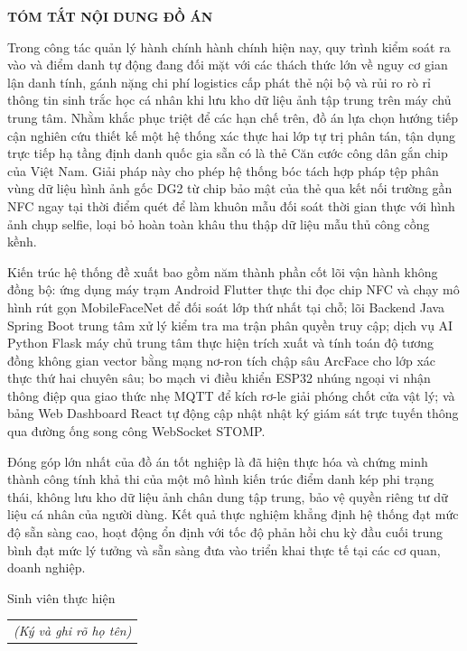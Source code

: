 \documentclass[../DoAn.tex]{subfiles}
\begin{document}
\begin{center}
    \Large{\textbf{TÓM TẮT NỘI DUNG ĐỒ ÁN}}\\
\end{center}
\vspace{1cm}

Trong công tác quản lý hành chính hành chính hiện nay, quy trình kiểm soát ra vào và điểm danh tự động đang đối mặt với các thách thức lớn về nguy cơ gian lận danh tính, gánh nặng chi phí logistics cấp phát thẻ nội bộ và rủi ro rò rỉ thông tin sinh trắc học cá nhân khi lưu kho dữ liệu ảnh tập trung trên máy chủ trung tâm. Nhằm khắc phục triệt để các hạn chế trên, đồ án lựa chọn hướng tiếp cận nghiên cứu thiết kế một hệ thống xác thực hai lớp tự trị phân tán, tận dụng trực tiếp hạ tầng định danh quốc gia sẵn có là thẻ Căn cước công dân gắn chip của Việt Nam. Giải pháp này cho phép hệ thống bóc tách hợp pháp tệp phân vùng dữ liệu hình ảnh gốc DG2 từ chip bảo mật của thẻ qua kết nối trường gần NFC ngay tại thời điểm quét để làm khuôn mẫu đối soát thời gian thực với hình ảnh chụp selfie, loại bỏ hoàn toàn khâu thu thập dữ liệu mẫu thủ công cồng kềnh. 

Kiến trúc hệ thống đề xuất bao gồm năm thành phần cốt lõi vận hành không đồng bộ: ứng dụng máy trạm Android Flutter thực thi đọc chip NFC và chạy mô hình rút gọn MobileFaceNet để đối soát lớp thứ nhất tại chỗ; lõi Backend Java Spring Boot trung tâm xử lý kiểm tra ma trận phân quyền truy cập; dịch vụ AI Python Flask máy chủ trung tâm thực hiện trích xuất và tính toán độ tương đồng không gian vector bằng mạng nơ-ron tích chập sâu ArcFace cho lớp xác thực thứ hai chuyên sâu; bo mạch vi điều khiển ESP32 nhúng ngoại vi nhận thông điệp qua giao thức nhẹ MQTT để kích rơ-le giải phóng chốt cửa vật lý; và bảng Web Dashboard React tự động cập nhật nhật ký giám sát trực tuyến thông qua đường ống song công WebSocket STOMP. 

Đóng góp lớn nhất của đồ án tốt nghiệp là đã hiện thực hóa và chứng minh thành công tính khả thi của một mô hình kiến trúc điểm danh kép phi trạng thái, không lưu kho dữ liệu ảnh chân dung tập trung, bảo vệ quyền riêng tư dữ liệu cá nhân của người dùng. Kết quả thực nghiệm khẳng định hệ thống đạt mức độ sẵn sàng cao, hoạt động ổn định với tốc độ phản hồi chu kỳ đầu cuối trung bình đạt mức lý tưởng và sẵn sàng đưa vào triển khai thực tế tại các cơ quan, doanh nghiệp.

\begin{flushright}
Sinh viên thực hiện\\
\vspace{1cm}
\begin{tabular}{@{}c@{}}
\textit{(Ký và ghi rõ họ tên)}
\end{tabular}
\end{flushright}
\end{document}

